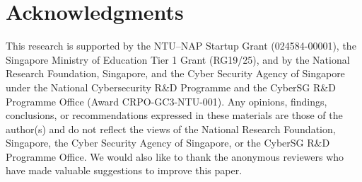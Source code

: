 \section*{Acknowledgments}

This research is supported by the NTU–NAP Startup Grant (024584-00001), the Singapore Ministry of Education Tier 1 Grant (RG19/25), and by the National Research Foundation, Singapore, and the Cyber Security Agency of Singapore under the National Cybersecurity R\&D Programme and the CyberSG R\&D Programme Office (Award CRPO-GC3-NTU-001). Any opinions, findings, conclusions, or recommendations expressed in these materials are those of the author(s) and do not reflect the views of the National Research Foundation, Singapore, the Cyber Security Agency of Singapore, or the CyberSG R\&D Programme Office.
We would also like to thank the anonymous reviewers who have made valuable suggestions to improve this paper.